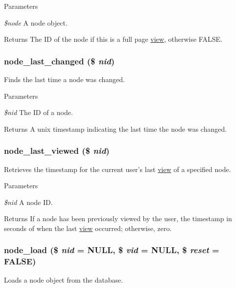 \begin{DoxyParams}{Parameters}
\item[{\em \$node}]A node object.\end{DoxyParams}
\begin{DoxyReturn}{Returns}
The ID of the node if this is a full page \hyperlink{classview}{view}, otherwise FALSE. 
\end{DoxyReturn}
\hypertarget{node_8module_ab303a54f9fd1d97c981f86a84610920b}{
\subsubsection[{node\_\-last\_\-changed}]{\setlength{\rightskip}{0pt plus 5cm}node\_\-last\_\-changed (\$ {\em nid})}}
\label{node_8module_ab303a54f9fd1d97c981f86a84610920b}
Finds the last time a node was changed.


\begin{DoxyParams}{Parameters}
\item[{\em \$nid}]The ID of a node.\end{DoxyParams}
\begin{DoxyReturn}{Returns}
A unix timestamp indicating the last time the node was changed. 
\end{DoxyReturn}
\hypertarget{node_8module_a95211205a8e6b1181239842b2428666d}{
\subsubsection[{node\_\-last\_\-viewed}]{\setlength{\rightskip}{0pt plus 5cm}node\_\-last\_\-viewed (\$ {\em nid})}}
\label{node_8module_a95211205a8e6b1181239842b2428666d}
Retrieves the timestamp for the current user's last \hyperlink{classview}{view} of a specified node.


\begin{DoxyParams}{Parameters}
\item[{\em \$nid}]A node ID.\end{DoxyParams}
\begin{DoxyReturn}{Returns}
If a node has been previously viewed by the user, the timestamp in seconds of when the last \hyperlink{classview}{view} occurred; otherwise, zero. 
\end{DoxyReturn}
\hypertarget{node_8module_a492ddfc12843e71242bb484a44e51a19}{
\subsubsection[{node\_\-load}]{\setlength{\rightskip}{0pt plus 5cm}node\_\-load (\$ {\em nid} = {\ttfamily NULL}, \/  \$ {\em vid} = {\ttfamily NULL}, \/  \$ {\em reset} = {\ttfamily FALSE})}}
\label{node_8module_a492ddfc12843e71242bb484a44e51a19}
Loads a node object from the database.


